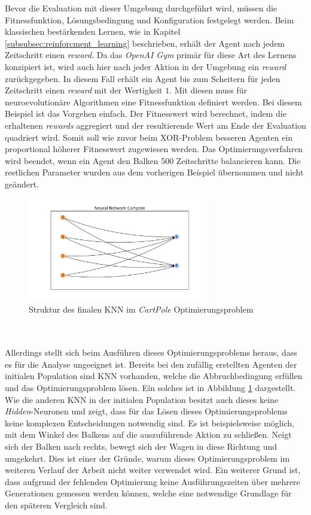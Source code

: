 Bevor die Evaluation mit dieser Umgebung durchgeführt wird, müssen die Fitnessfunktion, Lösungsbedingung und Konfiguration festgelegt werden. Beim klassischen bestärkenden Lernen, wie in Kapitel \ref{subsubsec:reinforcment_learning} beschrieben, erhält der Agent nach jedem Zeitschritt einen \emph{reward}. Da das \emph{OpenAI Gym} primär für diese Art des Lernens konzipiert ist, wird auch hier nach jeder Aktion in der Umgebung ein \emph{reward} zurückgegeben. In diesem Fall erhält ein Agent bis zum Scheitern für jeden Zeitschritt einen \emph{reward} mit der Wertigkeit $1$. Mit diesen muss für neuroevolutionäre Algorithmen eine Fitnessfunktion definiert werden. Bei diesem Beispiel ist das Vorgehen einfach. Der Fitnesswert wird berechnet, indem die erhaltenen \emph{rewards} aggregiert und der resultierende Wert am Ende der Evaluation quadriert wird. Somit soll wie zuvor beim XOR-Problem besseren Agenten ein proportional höherer Fitnesswert zugewiesen werden. Das Optimierungsverfahren wird beendet, wenn ein Agent den Balken 500 Zeitschritte balancieren kann. Die restlichen Parameter wurden aus dem vorherigen Beispiel übernommen und nicht geändert.
\begin{figure}[!h]
	\centering
	\includegraphics[width=0.7\textwidth]{./img/pole_balancing_single_core/cartpole_neuroal_network.pdf} 
	\caption{Struktur des finalen KNN im \emph{CartPole} Optimierungsproblem}
	\label{fig:cartpole_neural_network}
\end{figure}
\\\\
Allerdings stellt sich beim Ausführen dieses Optimierungsproblems heraus, dass es für die Analyse ungeeignet ist. Bereits bei den zufällig erstellten Agenten der initialen Population sind \ac{KNN} vorhanden, welche die Abbruchbedingung erfüllen und das Optimierungsproblem lösen. Ein solches ist in Abbildung \ref{fig:cartpole_neural_network} dargestellt. Wie die anderen \ac{KNN} in der initialen Population besitzt auch dieses keine \emph{Hidden}-Neuronen und zeigt, dass für das Lösen dieses Optimierungsproblems keine komplexen Entscheidungen notwendig sind. Es ist beispielsweise möglich, mit dem Winkel des Balkens auf die auszuführende Aktion zu schließen. Neigt sich der Balken nach rechts, bewegt sich der Wagen in diese Richtung und umgekehrt. Dies ist einer der Gründe, warum dieses Optimierungsproblem im weiteren Verlauf der Arbeit nicht weiter verwendet wird. Ein weiterer Grund ist, dass aufgrund der fehlenden Optimierung keine Ausführungszeiten über mehrere Generationen gemessen werden können, welche eine notwendige Grundlage für den späteren Vergleich sind.

